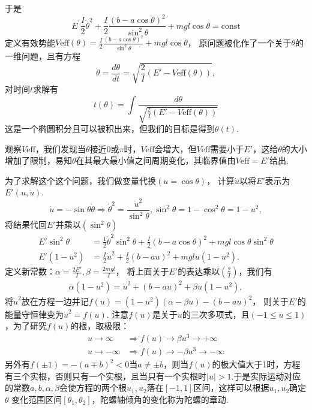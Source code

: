 \documentclass[UTF8,10.5pt,a4paper]{ctexart}
\numberwithin{equation}{section}
\theoremstyle{definition}
\theoremstyle{definition}
\begin{document}
于是
$$E^{\prime}\frac{I}{2}\dot{\theta}^{2} +\frac{I}{2}\frac{\left( b - a\cos \theta \right)^{2}}{\sin^{2}\theta}+mgl\cos\theta = \text{const}$$
定义有效势能$V\text{eff}(\theta) = \frac{I}{2}\frac{\left( b - a\cos \theta \right)^{2}}{\sin^{2}\theta}+mgl\cos\theta $，
原问题被化作了一个关于$\theta$的一维问题，且有方程
$$\dot{\theta} = \frac{d\theta}{dt} = \sqrt{\frac{2}{I}\left( E' -V\text{eff}(\theta) \right)},$$
对时间$t$求解有
$$t(\theta) = \int_{}^{}\frac{d\theta}{\sqrt{\frac{2}{I}\left(E'-V\text{eff}(\theta) \right)}}$$
这是一个椭圆积分且可以被积出来，但我们的目标是得到$\theta(t)$.
\par 观察$V\text{eff}$，我们发现当$\theta$接近$0$或$\pi$时，$V\text{eff}$会增大，但$V\text{eff}$需要小于$E'$，这给$\theta$的大小增加了限制，易知$\theta$在其最大最小值之间周期变化，其临界值由$V\text{eff}=E'$给出.
\par 为了求解这个这个问题，我们做变量代换$(u = \cos \theta)$，
计算$\dot{u}$以将$E'$表示为$E'(u,\dot{u})$.
$$\dot{u} = -\sin \theta\dot{\theta} \Rightarrow\dot{\theta}^{2} = \frac{\dot{u}^{2}}{\sin^{2}\theta}, \sin^{2}\theta = 1 - \cos^{2}\theta = 1 - u^{2},$$
将结果代回$E'$并乘以$(\sin^{2}\theta)$
\begin{align*}
    E'\sin^{2}\theta &= \frac{1}{2}\dot{\theta}^{2}\sin^{2}\theta +
    \frac{I}{2}\left( b - a\cos \theta \right)^{2} + mgl\cos \theta
    \sin^{2}\theta\\
    E'(1 - u^{2}) &= \frac{I}{2}\dot{u}^{2} + \frac{I}{2}\left( b - au
\right)^{2} + mglu(1 - u^{2}).
\end{align*}
定义新常数：$\alpha = \frac{2E'}{I}, \beta = \frac{2mgl}{I}$，
将上面关于$E'$的表达乘以$(\frac{2}{I})$，我们有
\begin{align*}
\alpha(1 - u^{2}) = \dot{u}^{2} + (b - au)^{2}+\beta u(1 - u^{2}),
\end{align*}
将$\dot{u}^{2}$放在方程一边并记$f(u)=(1 - u^{2})(\alpha - \beta u) - (b - au)^{2}$，
则关于$E'$的能量守恒律变为$\dot{u}^{2}=f(u)$.
注意$f(u)$是关于$u$的三次多项式，且$(-1 \leq u \leq 1)$，为了研究$f(u)$的根，取极限：
\begin{align*}
u \rightarrow \infty &\Rightarrow f(u) \rightarrow \beta u^{3}
\rightarrow + \infty\\
u \rightarrow -\infty &\Rightarrow f(u) \rightarrow -\beta u^{3}
\rightarrow -\infty
\end{align*}
另外有$f(\pm1)=-(a\mp b)^2<0$当$a\neq \pm b$，则当$f(u)$的极大值大于1时，方程有三个实根，否则只有一个实根，且当只有一个实根时$|u|>1$.于是实际运动对应的常数$a,b,\alpha,\beta$会使方程的两个根$u_1,u_2$落在$[-1,1]$区间，这样可以根据$u_1,u_2$确定$\theta$ 变化范围区间$[\theta_1,\theta_2]$，陀螺轴倾角的变化称为陀螺的章动.
\end{document}
